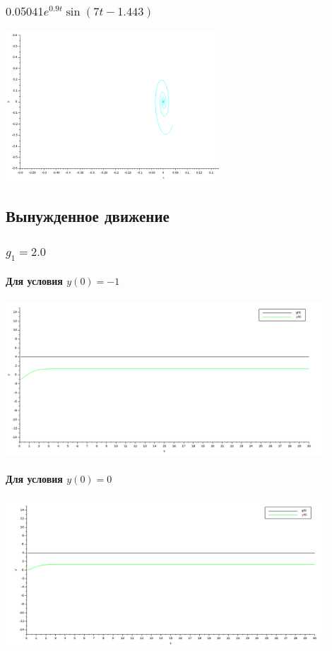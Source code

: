 \documentclass[12pt, a4paper] {ncc}
\begin{document}
\subsubsection{ $ 0.05041 e^{0.9t} \sin(7t - 1.443)$}
\begin{center}
\includegraphics[width=0.6\textwidth]{3f}
\end{center}

\subsection{Вынужденное движение}

\subsubsection{$g_1 = 2.0$}

\paragraph{Для условия $y(0) = -1$}
\begin{center}
\includegraphics[width=0.9\textwidth]{g-1.png}
\end{center}

\paragraph{Для условия $y(0) = 0$}
\begin{center}
\includegraphics[width=0.9\textwidth]{g0.png}
\end{center}
\end{document}
